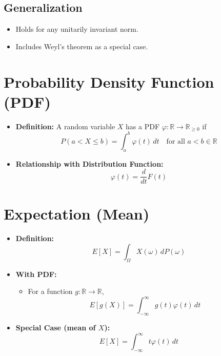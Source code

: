 \documentclass{article}
\begin{document}
\subsection{Generalization}
\begin{itemize}
    \item Holds for any unitarily invariant norm.
    \item Includes Weyl's theorem as a special case.
\end{itemize}











\section*{Probability Density Function (PDF)}
\begin{itemize}
    \item \textbf{Definition:} A random variable $X$ has a PDF $\varphi : \mathbb{R} \to \mathbb{R}_{\geq 0}$ if 
    \[
    P(a < X \leq b) = \int_a^b \varphi(t) \, dt \quad \text{for all } a < b \in \mathbb{R}
    \]
    
    \item \textbf{Relationship with Distribution Function:}
    \[
    \varphi(t) = \frac{d}{dt} F(t)
    \]
\end{itemize}

\section*{Expectation (Mean)}
\begin{itemize}
    \item \textbf{Definition:}
    \[
    E[X] = \int_{\Omega} X(\omega) \, dP(\omega)
    \]
    
    \item \textbf{With PDF:}
    \begin{itemize}
        \item For a function $g : \mathbb{R} \to \mathbb{R}$,
        \[
        E[g(X)] = \int_{-\infty}^{\infty} g(t) \varphi(t) \, dt
        \]
    \end{itemize}
    
    \item \textbf{Special Case (mean of $X$):}
    \[
    E[X] = \int_{-\infty}^{\infty} t \varphi(t) \, dt
    \]
\end{itemize}
\end{document}
